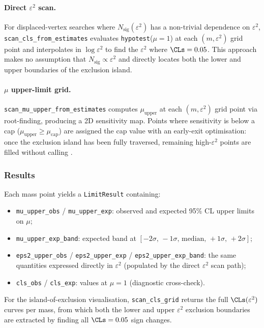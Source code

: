 \paragraph{Direct $\varepsilon^2$ scan.}
For displaced-vertex searches where $N_\text{sig}(\varepsilon^2)$ has a
non-trivial dependence on $\varepsilon^2$, \texttt{scan\_cls\_from\_estimates}
evaluates \texttt{hypotest}($\mu=1$) at each $(m, \varepsilon^2)$ grid point
and interpolates in $\log\varepsilon^2$ to find the $\varepsilon^2$ where
$\CLs = 0.05$.  This approach makes no assumption that
$N_\text{sig} \propto \varepsilon^2$ and directly locates both the lower and
upper boundaries of the exclusion island.

\paragraph{$\mu$ upper-limit grid.}
\texttt{scan\_mu\_upper\_from\_estimates} computes $\mu_\text{upper}$ at each
$(m, \varepsilon^2)$ grid point via root-finding, producing a 2D sensitivity
map.  Points where sensitivity is below a cap ($\mu_\text{upper} \geq
\mu_\text{cap}$) are assigned the cap value with an early-exit optimisation:
once the exclusion island has been fully traversed, remaining high-$\varepsilon^2$
points are filled without calling \pyhf{}.

\subsubsection{Results}

Each mass point yields a \texttt{LimitResult} containing:
%
\begin{itemize}
  \item \texttt{mu\_upper\_obs} / \texttt{mu\_upper\_exp}: observed and
    expected 95\% CL upper limits on $\mu$;
  \item \texttt{mu\_upper\_exp\_band}: expected band at
    $[-2\sigma,\,-1\sigma,\,\text{median},\,+1\sigma,\,+2\sigma]$;
  \item \texttt{eps2\_upper\_obs} / \texttt{eps2\_upper\_exp} /
    \texttt{eps2\_upper\_exp\_band}: the same quantities expressed directly
    in $\varepsilon^2$ (populated by the direct $\varepsilon^2$ scan path);
  \item \texttt{cls\_obs} / \texttt{cls\_exp}: \CLs{} values at $\mu = 1$
    (diagnostic cross-check).
\end{itemize}
%
For the island-of-exclusion visualisation, \texttt{scan\_cls\_grid} returns
the full $\CLs(\varepsilon^2)$ curves per mass, from which both the lower and
upper $\varepsilon^2$ exclusion boundaries are extracted by finding all
$\CLs = 0.05$ sign changes.

